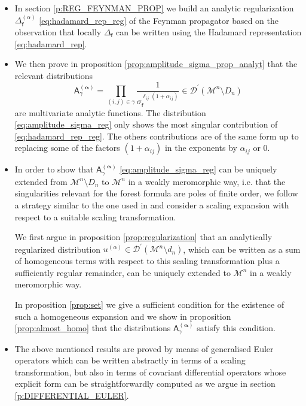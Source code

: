 \documentclass[11pt]{book}
\newcommand{\alphabd}{\boldsymbol{\alpha}}
\newcommand{\Dcal}{\mathcal{D}}
\newcommand{\Mcal}{\mathcal{M}}
\newcommand{\Asf}{\mathsf{A}}
\newcommand{\fsf}{\mathsf{f}}
\theoremstyle{break}
\begin{document}
\begin{itemize}


\item In section \ref{p:REG_FEYNMAN_PROP} we build an analytic regularization $\Delta^{(\alpha)}_\fsf$ \eqref{eq:hadamard_rep_reg} of the Feynman propagator based on the observation that locally $\Delta_\fsf$ can be written using the Hadamard representation \eqref{eq:hadamard_rep}. 


\item We then prove in proposition \ref{prop:amplitude_sigma_prop_analyt} that the relevant distributions 
%
\begin{equation}
\Asf_\gamma^{(\alphabd)} = \prod_{(i,j)\in\gamma} \frac{1}{\sigma_\fsf^{\ell_{ij}(1+\alpha_{ij})}} \in \Dcal^\prime(\Mcal^n\setminus D_n)
\label{eq:amplitude_sigma_reg}
\end{equation}
\index{$\Asf_\gamma^{(\alphabd)}$}%
%
are multivariate analytic functions. The distribution \eqref{eq:amplitude_sigma_reg} only shows the most singular contribution of \eqref{eq:hadamard_rep_reg}. The others contributions are of the same form up to replacing some of the factors $(1+\alpha_{ij})$ in the exponents by $\alpha_{ij}$ or $0$.


\item In order to show that $\Asf_\gamma^{(\alphabd)}$ \eqref{eq:amplitude_sigma_reg} can be uniquely extended from $\Mcal^n\setminus D_n$ to $\Mcal^n$ in a weakly meromorphic way, i.e. that the singularities relevant for the forest formula are poles of finite order, we follow a strategy similar to the one used in \cite{hollands_local_2001} and consider a scaling expansion with respect to a suitable scaling transformation. 

We first argue in proposition \ref{prop:regularization} that an analytically regularized distribution $u^{(\alpha)}\in\Dcal^\prime(\Mcal^n\setminus d_n)$, which can be written as a sum of homogeneous terms with respect to this scaling transformation plus a sufficiently regular remainder, can be uniquely extended to $\Mcal^n$ in a weakly meromorphic way.

In proposition \ref{prop:set} we give a sufficient condition for the existence of such a homogeneous expansion and we show in proposition \ref{prop:almost_homo} that the distributions $\Asf_\gamma^{(\alphabd)}$ satisfy this condition.


\item 
The above mentioned results are proved by means of generalised Euler operators which can be written abstractly in terms of a scaling transformation, but also in terms of covariant differential operators whose explicit form can be straightforwardly computed as we argue in section \ref{p:DIFFERENTIAL_EULER}. 


\end{itemize}
\end{document}
